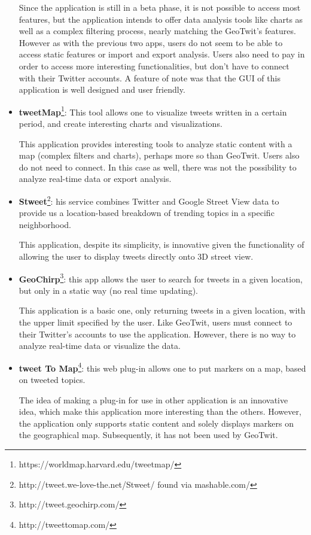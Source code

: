 \documentclass[a4paper,11pt]{report}
\begin{document}
\begin{itemize}
	Since the application is still in a beta phase, it is not possible to access most features, but the application intends to offer data analysis tools like charts as well as a complex filtering process, nearly matching the GeoTwit's features. However as with the previous two apps, users do not seem to be able to access static features or import and export analysis. Users also need to pay in order to access more interesting functionalities, but don't have to connect with their Twitter accounts. A feature of note was that the GUI of this application is well designed and user friendly.
	\item \textbf{tweetMap}\footnote{https://worldmap.harvard.edu/tweetmap/}: This tool allows one to visualize tweets written in a certain period, and create interesting charts and visualizations.
	
	This application provides interesting tools to analyze static content with a map (complex filters and charts), perhaps more so than GeoTwit. Users also do not need to connect. In this case as well, there was not the possibility to analyze real-time data or export analysis.
	\item \textbf{Stweet}\footnote{http://tweet.we-love-the.net/Stweet/ found via mashable.com/}: his service combines Twitter and Google Street View data to provide us a location-based breakdown of trending topics in a specific neighborhood.
	
	This application, despite its simplicity, is innovative given the functionality of allowing the user to display tweets directly onto 3D street view.
	\item \textbf{GeoChirp}\footnote{http://tweet.geochirp.com/}: this app allows the user to search for tweets in a given location, but only in a static way (no real time updating).
	
This application is a basic one, only returning tweets in a given location, with the upper limit specified by the user. Like GeoTwit, users must connect to their Twitter's accounts to use the application. However, there is no way to analyze real-time data or visualize the data.
	\item \textbf{tweet To Map}\footnote{http://tweettomap.com/}: this web plug-in allows one to put markers on a map, based on tweeted topics.
	
	The idea of making a plug-in for use in other application is an innovative idea, which make this application more interesting than the others. However, the application only supports static content and solely displays markers on the geographical map. Subsequently, it has not been used by GeoTwit.
\end{itemize}
\bigskip
\newpage
\end{document}
